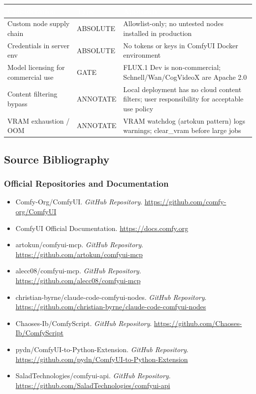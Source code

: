 \documentclass[11pt,letterpaper]{article}
\newcommand{\tableheader}[1]{\textbf{\sffamily\textcolor{white}{#1}}}
\begin{document}
\begin{center}
\begin{tabularx}{\textwidth}{L{3.5cm}L{2cm}X}
\toprule
{}
\tableheader{Consideration} & \tableheader{Type} & \tableheader{Approach} \\
\midrule
Custom node supply chain & ABSOLUTE & Allowlist-only; no untested nodes installed in production \\
Credentials in server env & ABSOLUTE & No tokens or keys in ComfyUI Docker environment \\
Model licensing for commercial use & GATE & FLUX.1 Dev is non-commercial; Schnell/Wan/CogVideoX are Apache 2.0 \\
Content filtering bypass & ANNOTATE & Local deployment has no cloud content filters; user responsibility for acceptable use policy \\
VRAM exhaustion / OOM & ANNOTATE & VRAM watchdog (artokun pattern) logs warnings; clear\_vram before large jobs \\
\bottomrule
\end{tabularx}
\end{center}

\subsection{Source Bibliography}

\subsubsection{Official Repositories and Documentation}
\begin{itemize}[leftmargin=1.5em]
  \item Comfy-Org/ComfyUI. \textit{GitHub Repository}. \url{https://github.com/comfy-org/ComfyUI}
  \item ComfyUI Official Documentation. \url{https://docs.comfy.org}
  \item artokun/comfyui-mcp. \textit{GitHub Repository}. \url{https://github.com/artokun/comfyui-mcp}
  \item alecc08/comfyui-mcp. \textit{GitHub Repository}. \url{https://github.com/alecc08/comfyui-mcp}
  \item christian-byrne/claude-code-comfyui-nodes. \textit{GitHub Repository}. \url{https://github.com/christian-byrne/claude-code-comfyui-nodes}
  \item Chaoses-Ib/ComfyScript. \textit{GitHub Repository}. \url{https://github.com/Chaoses-Ib/ComfyScript}
  \item pydn/ComfyUI-to-Python-Extension. \textit{GitHub Repository}. \url{https://github.com/pydn/ComfyUI-to-Python-Extension}
  \item SaladTechnologies/comfyui-api. \textit{GitHub Repository}. \url{https://github.com/SaladTechnologies/comfyui-api}
\end{itemize}
\end{document}

